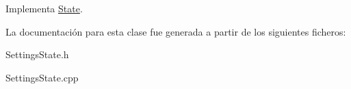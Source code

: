 Implementa \hyperlink{classState_aa6366828eb50639e86b94008cfad9c5d}{State}.



La documentación para esta clase fue generada a partir de los siguientes ficheros\+:\begin{DoxyCompactItemize}
\item 
Settings\+State.\+h\item 
Settings\+State.\+cpp\end{DoxyCompactItemize}
